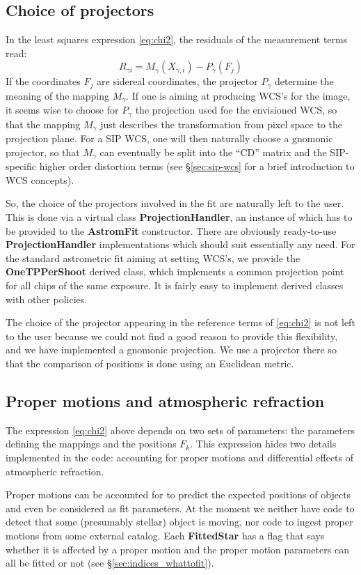 \documentclass[a4paper,12pt]{scrartcl}
\newcommand{\ClName}[1]{{\bf #1}}
\def\bf{\normalfont\bfseries}
\begin{document}
\subsection{Choice of projectors}
In the least squares expression \ref{eq:chi2}, the residuals of the
measurement terms read:
$$
R_{\gamma i} = M_\gamma(X_{\gamma,i})-P_{\gamma}(F_j)
$$
If the coordinates $F_j$ are sidereal coordinates,
the projector $P_\gamma$ determine the meaning of
the mapping $M_\gamma$. If one is aiming at producing
WCS's for the image, it seems wise to choose for
$P_\gamma$ the projection used foe the envisioned WCS,
so that the mapping $M_\gamma$ just describes the 
transformation from pixel space to the projection plane.
For a SIP WCS, one will then naturally choose a gnomonic projector,
so that $M_\gamma$ can eventually be split into the ``CD'' matrix 
and the SIP-specific higher order distortion terms (see \S \ref{sec:sip-wcs}
for a brief introduction to WCS concepts).

So, the choice of the projectors involved in the fit
are naturally left to the user. This is done via a
virtual class \ClName{ProjectionHandler}, an instance
of which has to be provided to the \ClName{AstromFit} constructor.
There are obviously ready-to-use \ClName{ProjectionHandler} implementations
which should suit essentially any need. For the standard astrometric
fit aiming at setting WCS's, we provide the \ClName{OneTPPerShoot}
derived class, which implements a common projection point
for all chips of the same exposure. It is fairly easy to implement
derived classes with other policies.

The choice of the projector appearing in the reference terms of
\ref{eq:chi2} is not left to the user because we could not find a good
reason to provide this flexibility, and we have implemented a gnomonic
projection. We use a projector there so that the comparison of
positions is done using an Euclidean metric.


\subsection{Proper motions and atmospheric refraction}
The expression \ref{eq:chi2} above depends on two sets of parameters:
the parameters defining the mappings and the positions $F_k$. This expression
hides two details implemented in the code: accounting for proper
motions and differential effects of atmospheric refraction.

Proper motions can be accounted for to predict the expected positions
of objects and even be considered as fit parameters. At the moment we
neither have code to detect that some (presumably stellar) object is
moving, nor code to ingest proper motions from some external catalog.
Each \ClName{FittedStar} has a flag that says whether it is affected
by a proper motion and the proper motion parameters can all be fitted
or not (see \S \ref{sec:indices_whattofit}).
\end{document}
